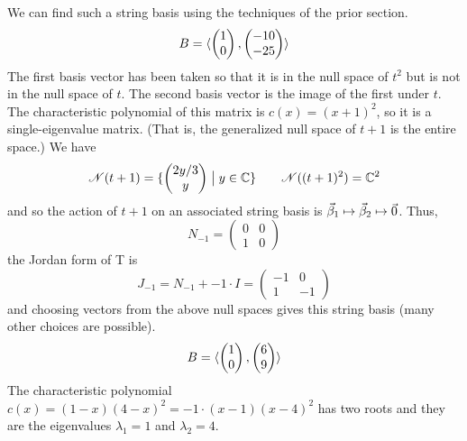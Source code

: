 \begin{exercises}
\begin{answer}
\begin{exparts}
           We can find such a string basis using the techniques of the 
           prior section.
           \begin{equation*}
                 B=\langle\begin{pmatrix} 1 \\ 0 \end{pmatrix},
                             \begin{pmatrix} -10 \\ -25 \end{pmatrix}\rangle
           \end{equation*}
           The first basis vector has been taken so that it is in
           the null space of $t^2$ but is not in the null space of $t$.
           The second basis vector is the image of the first under $t$.
        \partsitem The characteristic polynomial of this matrix
           is \( c(x)=(x+1)^2 \), so it is a single-eigenvalue matrix.
           (That is, the generalized null space of $t+1$ is the entire
           space.) 
           We have
           \begin{equation*}
             \mathscr{N}(t+1)=\mbox{$\{\begin{pmatrix} 2y/3 \\ y \end{pmatrix}\bigm|
                                     y\in\mathbb{C}\}$} 
             \qquad
             \mathscr{N}((t+1)^2)=\mathbb{C}^2 
           \end{equation*}
           and so the action of $t+1$ on
           an associated string basis is 
           $\vec{\beta}_1\mapsto\vec{\beta}_2\mapsto\vec{0}$.
           Thus, 
           \begin{equation*}
             N_{-1}
             =
             \begin{pmatrix}
                0  &0  \\
                1  &0 
             \end{pmatrix}
           \end{equation*}
           the Jordan form of T is
           \begin{equation*}
             J_{-1}=N_{-1}+-1\cdot I
             =
             \begin{pmatrix}
               -1  &0  \\
                1  &-1
             \end{pmatrix}
           \end{equation*}
           and choosing vectors from the above null spaces gives
           this string basis (many other choices are possible).
           \begin{equation*}
             B=\langle\begin{pmatrix} 1 \\ 0 \end{pmatrix},
                         \begin{pmatrix} 6 \\ 9 \end{pmatrix}\rangle
           \end{equation*}
        \partsitem The characteristic polynomial 
            \( c(x)=(1-x)(4-x)^2=-1\cdot (x-1)(x-4)^2 \) has two roots
            and they are the eigenvalues $\lambda_1=1$ and $\lambda_2=4$.


\end{exparts}
\end{answer}
\end{exercises}
